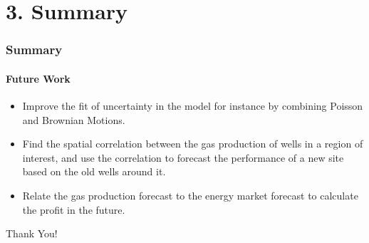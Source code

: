 \documentclass[11pt]{beamer}
\begin{document}
\section{3. Summary}
\begin{frame}
	\frametitle{Summary}
	\framesubtitle{Future Work}
	\justifying
\begin{itemize}
\item Improve the fit of uncertainty in the model for instance by combining Poisson and Brownian Motions.
		\item Find the spatial correlation between the gas production of wells in a region of interest, and use the correlation to forecast the performance of a new site based on the old wells around it.
		\item Relate the gas production forecast to the energy market forecast to calculate the profit in the future.
		\end{itemize}		
\end{frame}	

\begin{frame}	

\centering
{\Huge {\Huge Thank You!}}

\end{frame}
	
\end{document}
